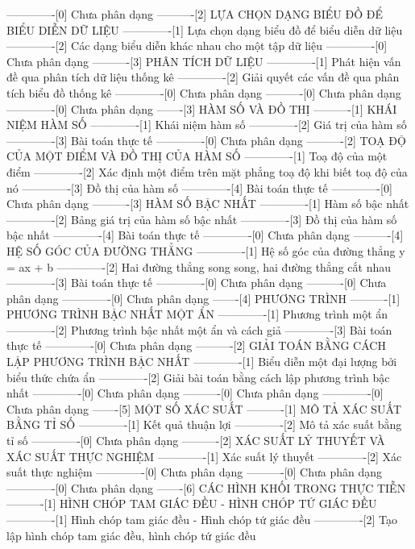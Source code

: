 -------------[0] Chưa phân dạng
----------[2] LỰA CHỌN DẠNG BIỂU ĐỒ ĐỂ BIỂU DIỄN DỮ LIỆU
-------------[1] Lựa chọn dạng biểu đồ để biểu diễn dữ liệu
-------------[2] Các dạng biểu diễn khác nhau cho một tập dữ liệu
-------------[0] Chưa phân dạng
----------[3] PHÂN TÍCH DỮ LIỆU
-------------[1] Phát hiện vấn đề qua phân tích dữ liệu thống kê
-------------[2] Giải quyết các vấn đề qua phân tích biểu đồ thống kê
-------------[0] Chưa phân dạng
----------[0] Chưa phân dạng
-------------[0] Chưa phân dạng
-------[3] HÀM SỐ VÀ ĐỒ THỊ
----------[1] KHÁI NIỆM HÀM SỐ
-------------[1] Khái niệm hàm số
-------------[2] Giá trị của hàm số
-------------[3] Bài toán thực tế
-------------[0] Chưa phân dạng
----------[2] TOẠ ĐỘ CỦA MỘT ĐIỂM VÀ ĐỒ THỊ CỦA HÀM SỐ
-------------[1] Toạ độ của một điểm
-------------[2] Xác định một điểm trên mặt phẳng toạ độ khi biết toạ độ của nó
-------------[3] Đồ thị của hàm số
-------------[4] Bài toán thực tế
-------------[0] Chưa phân dạng
----------[3] HÀM SỐ BẬC NHẤT
-------------[1] Hàm số bậc nhất
-------------[2] Bảng giá trị của hàm số bậc nhất
-------------[3] Đồ thị của hàm số bậc nhất
-------------[4] Bài toán thực tế
-------------[0] Chưa phân dạng
----------[4] HỆ SỐ GÓC CỦA ĐƯỜNG THẲNG
-------------[1] Hệ số góc của đường thẳng y = ax + b
-------------[2] Hai đường thẳng song song, hai đường thẳng cắt nhau
-------------[3] Bài toán thực tế
-------------[0] Chưa phân dạng
----------[0] Chưa phân dạng
-------------[0] Chưa phân dạng
-------[4] PHƯƠNG TRÌNH
----------[1] PHƯƠNG TRÌNH BẬC NHẤT MỘT ẨN
-------------[1] Phương trình một ẩn
-------------[2] Phương trình bậc nhất một ẩn và cách giả
-------------[3] Bài toán thực tế
-------------[0] Chưa phân dạng
----------[2] GIẢI TOÁN BẰNG CÁCH LẬP PHƯƠNG TRÌNH BẬC NHẤT
-------------[1] Biểu diễn một đại lượng bởi biểu thức chứa ẩn
-------------[2] Giải bài toán bằng cách lập phương trình bậc nhất
-------------[0] Chưa phân dạng
----------[0] Chưa phân dạng
-------------[0] Chưa phân dạng
-------[5] MỘT SỐ XÁC SUẤT
----------[1] MÔ TẢ XÁC SUẤT BẰNG TỈ SỐ
-------------[1] Kết quả thuận lợi
-------------[2] Mô tả xác suất bằng tỉ số
-------------[0] Chưa phân dạng
----------[2] XÁC SUẤT LÝ THUYẾT VÀ XÁC SUẤT THỰC NGHIỆM
-------------[1] Xác suất lý thuyết
-------------[2] Xác suất thực nghiệm
-------------[0] Chưa phân dạng
----------[0] Chưa phân dạng
-------------[0] Chưa phân dạng
-------[6] CÁC HÌNH KHỐI TRONG THỰC TIỄN
----------[1] HÌNH CHÓP TAM GIÁC ĐỀU - HÌNH CHÓP TỨ GIÁC ĐỀU
-------------[1] Hình chóp tam giác đều - Hình chóp tứ giác đều
-------------[2] Tạo lập hình chóp tam giác đều, hình chóp tứ giác đều
